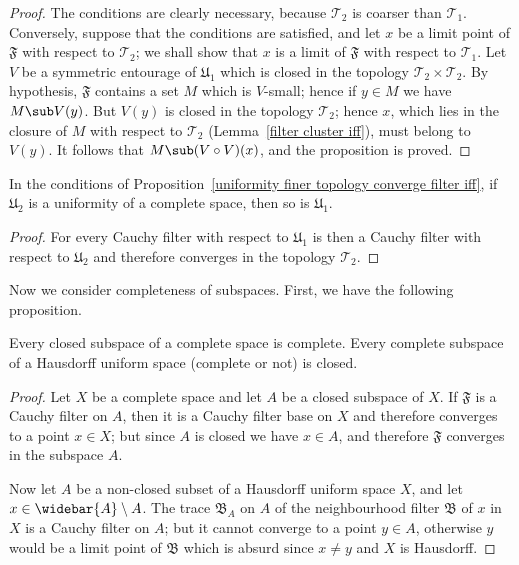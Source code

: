 \begin{proof}
The conditions are clearly necessary, because $\mathcal{T}_2$ is coarser than $\mathcal{T}_1$. Conversely, suppose that the conditions are satisfied, and let $x$ be a limit point of $\mathfrak{F}$ with respect to $\mathcal{T}_2$; we shall show that $x$ is a limit of $\mathfrak{F}$ with respect to $\mathcal{T}_1$. Let $V$ be a symmetric entourage of $\mathfrak{U}_1$ which is closed in the topology $\mathcal{T}_2\times\mathcal{T}_2$. By hypothesis, $\mathfrak{F}$ contains a set $M$ which is $V$-small; hence if $y\in M$ we have $M\sub V(y)$. But $V(y)$ is closed in the topology $\mathcal{T}_2$; hence $x$, which lies in the closure of $M$ with respect to $\mathcal{T}_2$ (Lemma~\ref{filter cluster iff}), must belong to $V(y)$. It follows that $M\sub(V\circ V)(x)$, and the proposition is proved. 
\end{proof}
\begin{corollary}
In the conditions of Proposition~\ref{uniformity finer topology converge filter iff}, if $\mathfrak{U}_2$ is a uniformity of a complete space, then so is $\mathfrak{U}_1$.
\end{corollary}
\begin{proof}
For every Cauchy filter with respect to $\mathfrak{U}_1$ is then a Cauchy filter with respect to $\mathfrak{U}_2$ and therefore converges in the topology $\mathcal{T}_2$.
\end{proof}
Now we consider completeness of subspaces. First, we have the following proposition.
\begin{proposition}\label{complete and subspace}
Every closed subspace of a complete space is complete. Every complete subspace of a Hausdorff uniform space (complete or not) is closed.
\end{proposition}
\begin{proof}
Let $X$ be a complete space and let $A$ be a closed subspace of $X$. If $\mathfrak{F}$ is a Cauchy filter on $A$, then it is a Cauchy filter base on $X$ and therefore converges to a point $x\in X$; but since $A$ is closed we have $x\in A$, and therefore $\mathfrak{F}$ converges in the subspace $A$.\par
Now let $A$ be a non-closed subset of a Hausdorff uniform space $X$, and let $x\in\widebar{A}\setminus A$. The trace $\mathfrak{B}_A$ on $A$ of the neighbourhood filter $\mathfrak{B}$ of $x$ in $X$ is a Cauchy filter on $A$; but it cannot converge to a point $y\in A$, otherwise $y$ would be a limit point of $\mathfrak{B}$ which is absurd since $x\neq y$ and $X$ is Hausdorff.
\end{proof}
